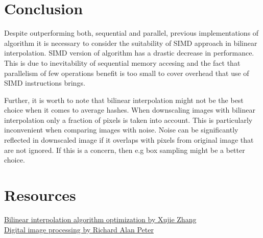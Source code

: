 \documentclass{article}
\begin{document}
\section{Conclusion}
Despite outperforming both, sequential and parallel, previous implementations of algorithm it is
necessary to consider the suitability of SIMD approach in bilinear interpolation. SIMD version of
algorithm has a drastic decrease in performance. This is due to inevitability of sequential
memory accesing and the fact that parallelism of few operations benefit is too small to cover
overhead that use of SIMD instructions brings.

Further, it is worth to note that bilinear interpolation might not be the best choice when it
comes to average hashes. When downscaling images with bilinear interpolation only a fraction of
pixels is taken into account. This is particularly inconvenient when comparing images with noise.
Noise can be significantly reflected in downscaled image if it overlaps with pixels from original
image that are not ignored. If this is a concern, then e.g box sampling might be a better choice.
\section{Resources}
\href{https://sites.google.com/site/zhangxujienet/streaming-simd-extensions-sse}
{Bilinear interpolation algorithm optimization by Xujie Zhang}
\\
\href{https://archive.org/download/Lectures_on_Image_Processing/EECE_4353_15_Resampling.pdf}
{Digital image processing by Richard Alan Peter}
\end{document}
